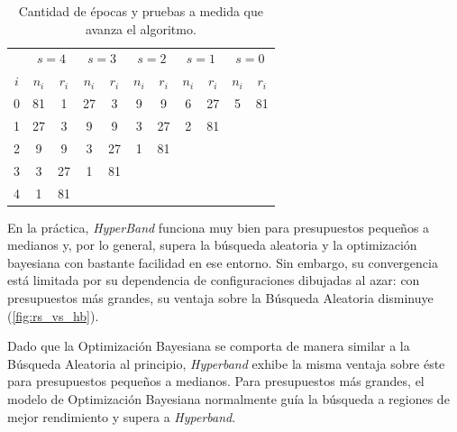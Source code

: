 \documentclass[a4paper,12pt]{article}
\begin{document}
\begin{table}[H]
	\centering
	\begin{tabular}{|l|cc|cc|cc|cc|cc|}
		\hline
		\multicolumn{1}{|c|}{}  & \multicolumn{2}{c|}{$s=4$} & \multicolumn{2}{c|}{$s=3$} & \multicolumn{2}{c|}{$s=2$} & \multicolumn{2}{c|}{$s=1$} & \multicolumn{2}{c|}{$s=0$} \\
		\multicolumn{1}{|c|}{$i$} & $n_i$ & $r_i$ & $n_i$ & $r_i$ & $n_i$ & $r_i$ & $n_i$ & $r_i$ & $n_i$ & $r_i$ \\ \hline
		0                         & 81    & 1     & 27    & 3     & 9     & 9     & 6     & 27    & 5     & 81    \\
		1                         & 27    & 3     & 9     & 9     & 3     & 27    & 2     & 81    &       &       \\
		2                         & 9     & 9     & 3     & 27    & 1     & 81    &       &       &       &       \\
		3                         & 3     & 27    & 1     & 81    &       &       &       &       &       &       \\
		4                         & 1     & 81    &       &       &       &       &       &       &       &       \\ \hline
	\end{tabular}
	\caption{Cantidad de épocas y pruebas a medida que avanza el algoritmo.}
	\label{tab:hyper-epochs-trials}
\end{table}

En la práctica, \textit{HyperBand} funciona muy bien para presupuestos pequeños a medianos y, por lo general, supera la búsqueda aleatoria y la optimización bayesiana con bastante facilidad en ese entorno. Sin embargo, su convergencia está limitada por su dependencia de configuraciones dibujadas al azar: con presupuestos más grandes, su ventaja sobre la Búsqueda Aleatoria disminuye (\ref{fig:rs_vs_hb}).

Dado que la Optimización Bayesiana se comporta de manera similar a la Búsqueda Aleatoria al principio, \textit{Hyperband} exhibe la misma ventaja sobre éste para presupuestos pequeños a medianos. Para presupuestos más grandes, el modelo de Optimización Bayesiana normalmente guía la búsqueda a regiones de mejor rendimiento y supera a \textit{Hyperband}.
\end{document}
